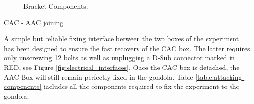 \begin{figure}[H]
    \noindent{}
    \caption{Bracket Components.}
    \label{fig:bracket}
\end{figure}

\bigskip
\underline{CAC - AAC joining}

\smallskip
A simple but reliable fixing interface between the two boxes of the experiment has been designed to ensure the fast recovery of the CAC box. The latter requires only unscrewing 12 bolts as well as unplugging a D-Sub connector marked in RED, see Figure \ref{fig:electrical_interfaces}. Once the CAC box is detached, the AAC Box will still remain perfectly fixed in the gondola. Table \ref{table:attaching-components} includes all the components required to fix the experiment to the gondola.

